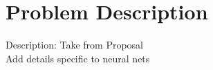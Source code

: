 \section{Problem Description}
\label{ProbDesc}

Description: Take from Proposal \\
Add details specific to neural nets
